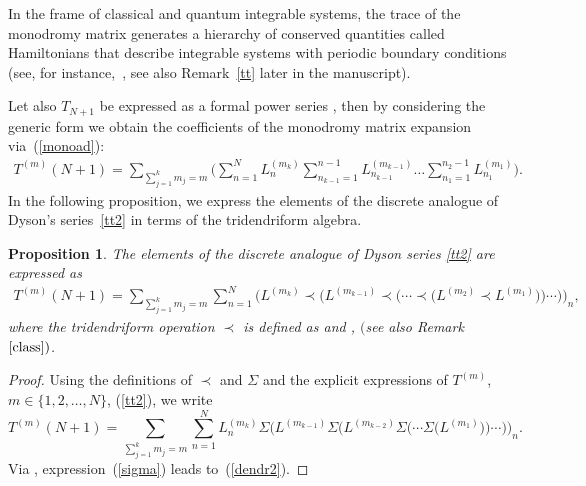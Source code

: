 \documentclass[10pt,a4paper]{amsart}
\numberwithin{equation}{section}
\newtheorem{pro}[thm]{Proposition}
\theoremstyle{definition}
\DeclareMathOperator{\EEnd}{End}%
\def\mathfrak#1{#1}%
\def\mathcal#1{#1}%
\begin{document}
In the frame of classical and quantum integrable systems, the trace of the monodromy matrix generates a hierarchy of conserved quantities called Hamiltonians that describe integrable systems with periodic boundary conditions (see, for instance,~\cite{FT, FadTakRes}, see also Remark~\ref{tt} later in the manuscript).

Let also $T_{N+1}$ be expressed as a formal power series , then by considering the generic form  we obtain the coefficients of the monodromy matrix expansion via~(\ref{monoad}):
\begin{gather}
T^{(m)}(N+1)= \sum_{\sum_{j=1}^km_j=m}\Biggl(\sum_{n=1}^N L_n^{(m_k)} \sum_{n_{k-1}=1}^{n-1 }L^{(m_{k-1})}_{n_{k-1}} \dots \sum_{n_{1}=1}^{n_2-1 }L^{(m_1)}_{n_1}\Biggr). \label{tt2}
\end{gather}
In the following proposition, we express the elements of the discrete analogue of
Dyson's series~\eqref{tt2} in terms of the tridendriform algebra.

\begin{pro}
{\label{lemma01}} The elements of the discrete analogue of Dyson series
\eqref{tt2} are expressed as
\begin{gather}
T^{(m)}(N+1) = \sum_{\sum_{j=1}^km_j=m}\sum_{n=1}^N \bigl(L^{(m_k)}\prec \bigl(L^{(m_{k-1})} \prec \bigl( \cdots \prec\bigl( L^{(m_2)}\prec L^{(m_1)}\bigr)\bigr)\cdots \bigr) \bigr)_n , \label{dendr2}
\end{gather}
where the tridendriform operation $\prec$ is defined as  and , \smash{$a,b \in \EEnd\bigl({\mathbb C}^{\mathcal N}\bigr) \otimes {\mathfrak A}$} $($see also Remark~$\ref{class})$.
\end{pro}
\begin{proof}
Using the definitions of $\prec$ and $\Sigma$ and the explicit expressions of $T^{(m)}$, $m \in \{1,2, \dots, N\}$, (\ref{tt2}), we write
\begin{equation}
T^{(m)}(N+1) =\sum_{\sum_{j=1}^km_j=m} \sum_{n=1}^N L^{(m_k)}_n \Sigma\bigl(L^{(m_{k-1})}\Sigma\bigl(L^{(m_{k-2})}\Sigma\bigl(\cdots \Sigma\bigl(L^{(m_1)}\bigr)\bigr)\cdots \bigr)\bigr)_n. \label{sigma}
\end{equation}
Via , expression~(\ref{sigma}) leads to~(\ref{dendr2}).
\end{proof}
\end{document}
